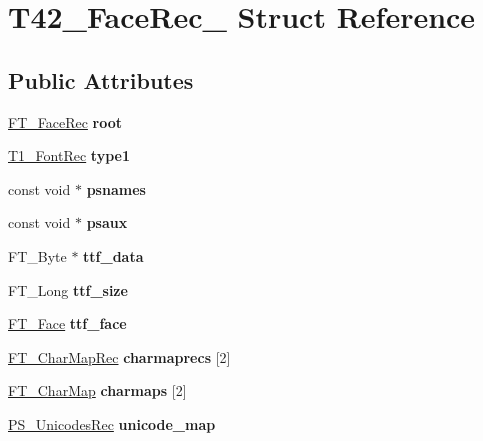 \hypertarget{struct_t42___face_rec__}{}\section{T42\+\_\+\+Face\+Rec\+\_\+ Struct Reference}
\label{struct_t42___face_rec__}
\subsection*{Public Attributes}
\begin{DoxyCompactItemize}
\item 
\mbox{\label{struct_t42___face_rec___abe06101c9b69119dc575312e204964dc}} 
\hyperlink{struct_f_t___face_rec__}{F\+T\+\_\+\+Face\+Rec} {\bfseries root}
\item 
\mbox{\label{struct_t42___face_rec___ac526c9f37d9bc12e254cbab6c52baf50}} 
\hyperlink{struct_t1___font_rec__}{T1\+\_\+\+Font\+Rec} {\bfseries type1}
\item 
\mbox{\label{struct_t42___face_rec___a3615cff933bce5beed22b6eaae45832c}} 
const void $\ast$ {\bfseries psnames}
\item 
\mbox{\label{struct_t42___face_rec___af50a7ef274e510d37d937481008c91bb}} 
const void $\ast$ {\bfseries psaux}
\item 
\mbox{\label{struct_t42___face_rec___aed1e79e76d1a7880647a9fb692c770fe}} 
F\+T\+\_\+\+Byte $\ast$ {\bfseries ttf\+\_\+data}
\item 
\mbox{\label{struct_t42___face_rec___a39ef5306c6b6b027a3f36f77746dc62f}} 
F\+T\+\_\+\+Long {\bfseries ttf\+\_\+size}
\item 
\mbox{\label{struct_t42___face_rec___a61182a51e9a4c2fd3902a33fa56963d3}} 
\hyperlink{struct_f_t___face_rec__}{F\+T\+\_\+\+Face} {\bfseries ttf\+\_\+face}
\item 
\mbox{\label{struct_t42___face_rec___aa842baec39075f9a4fc0cfb0024dbf46}} 
\hyperlink{struct_f_t___char_map_rec__}{F\+T\+\_\+\+Char\+Map\+Rec} {\bfseries charmaprecs} \mbox{[}2\mbox{]}
\item 
\mbox{\label{struct_t42___face_rec___a607785291a0275374a35bf8b25f7b79f}} 
\hyperlink{struct_f_t___char_map_rec__}{F\+T\+\_\+\+Char\+Map} {\bfseries charmaps} \mbox{[}2\mbox{]}
\item 
\mbox{\label{struct_t42___face_rec___ade91b4fcad8368091aa3cc948204da5c}} 
\hyperlink{struct_p_s___unicodes_rec__}{P\+S\+\_\+\+Unicodes\+Rec} {\bfseries unicode\+\_\+map}
\end{DoxyCompactItemize}


